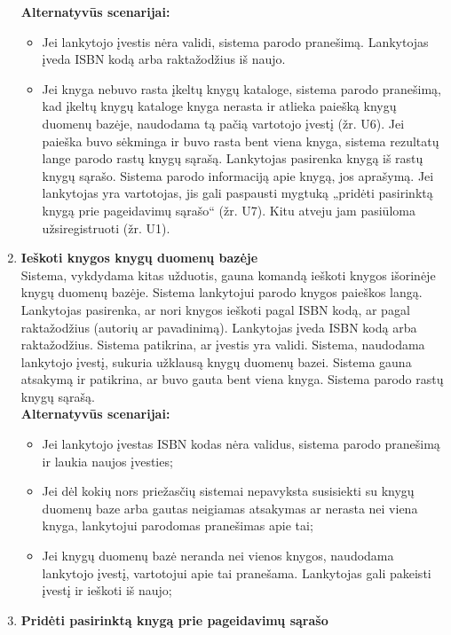 \documentclass{VUMIFPSkursinis}
\begin{document}
\begin{enumerate}[label=\textbf{U\arabic*.}]
				\textbf{Alternatyvūs scenarijai:}
				\begin{itemize}
					\item Jei lankytojo įvestis nėra validi, sistema parodo pranešimą. Lankytojas įveda ISBN kodą arba raktažodžius iš naujo.
					\item Jei knyga nebuvo rasta įkeltų knygų kataloge, sistema parodo pranešimą, kad įkeltų knygų kataloge knyga nerasta 
						ir atlieka paiešką knygų duomenų bazėje, naudodama tą pačią vartotojo įvestį (žr. U6). Jei paieška buvo sėkminga ir buvo rasta bent viena knyga, 
						sistema rezultatų lange parodo rastų knygų sąrašą. Lankytojas pasirenka knygą iš rastų knygų sąrašo.
						Sistema parodo informaciją apie knygą, jos aprašymą. Jei lankytojas yra vartotojas, jis gali paspausti mygtuką „pridėti pasirinktą knygą prie pageidavimų sąrašo“ (žr. U7).
						Kitu atveju jam pasiūloma užsiregistruoti (žr. U1).
				\end{itemize}
			\item \textbf{Ieškoti knygos knygų duomenų bazėje}\\
				Sistema, vykdydama kitas užduotis, gauna komandą ieškoti knygos išorinėje knygų duomenų bazėje. 
				Sistema lankytojui parodo knygos paieškos langą. Lankytojas pasirenka, ar nori knygos ieškoti pagal
				ISBN kodą, ar pagal raktažodžius (autorių ar pavadinimą). Lankytojas įveda ISBN kodą arba raktažodžius.
				Sistema patikrina, ar įvestis yra validi. Sistema, naudodama lankytojo įvestį, sukuria užklausą knygų duomenų bazei. 
				Sistema gauna atsakymą ir patikrina, ar buvo gauta bent viena knyga. Sistema parodo rastų knygų sąrašą.\\
				\textbf{Alternatyvūs scenarijai:}
				\begin{itemize}
					\item Jei lankytojo įvestas ISBN kodas nėra validus, sistema parodo pranešimą ir laukia naujos įvesties;
					\item Jei dėl kokių nors priežasčių sistemai nepavyksta susisiekti su knygų duomenų baze arba 
						gautas neigiamas atsakymas ar nerasta nei viena knyga, lankytojui parodomas pranešimas apie tai;
					\item Jei knygų duomenų bazė neranda nei vienos knygos, naudodama lankytojo įvestį, vartotojui apie tai pranešama. 
						Lankytojas gali pakeisti įvestį ir ieškoti iš naujo;
				\end{itemize}
			\item \textbf{Pridėti pasirinktą knygą prie pageidavimų sąrašo}\\

\end{enumerate}
\end{document}
